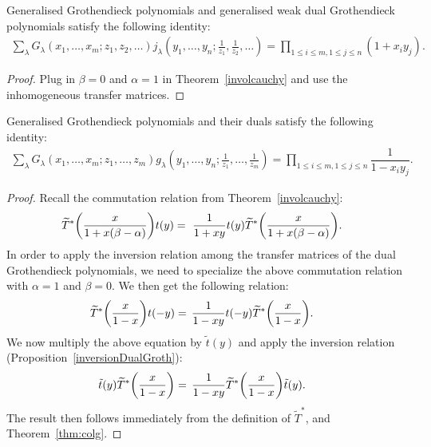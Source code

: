 \documentclass[ALCO, Unicode]{cedram}
\DeclarePairedDelimiter\autobracket{(}{)}
\newcommand{\br}[1]{\autobracket*{#1}}
\begin{document}
\begin{coro}
Generalised Grothendieck polynomials and generalised weak dual Grothendieck polynomials satisfy the following identity:
\begin{align}
\sum_{\lambda} G_{\lambda}(x_1,\dots,x_m;z_1,z_2,\dots) j_{\lambda} (y_1,\dots,y_n;\frac{1}{z_1},\frac{1}{z_2},\dots)= \prod_{1\le i\le m,1\le j\leq n} \left({1+x_iy_j} \right).
\end{align}
\end{coro}
\begin{proof}
Plug in $\beta=0$ and $\alpha=1$ in Theorem~\ref{involcauchy} and use the inhomogeneous transfer matrices.
\end{proof}

\begin{thm}
Generalised Grothendieck polynomials and their duals satisfy the following identity:
\begin{align}
\label{grothvsdual}
\sum_{\lambda} G_{\lambda}(x_1,\dots,x_m;z_1,\dots,z_m) g_{\lambda} (y_1,\dots,y_n;\frac{1}{z_1},\dots,\frac{1}{z_m})= \prod_{1\le i\le m,1\le j\leq n} \dfrac{1}{1-x_iy_j}.
\end{align}
\end{thm}
\begin{proof}
Recall the commutation relation from Theorem~\ref{involcauchy}:
\begin{align*}
\widetilde{T}^{*} \br{\dfrac{x}{1+x(\beta-\alpha)}}{t}(y)&=\text{ } \frac{1}{1+xy}  {t}(y)\widetilde{T}^{*} \br{\dfrac{x}{1+x(\beta-\alpha)}}.
\end{align*}
In order to apply the inversion relation among the transfer matrices of the dual Grothendieck polynomials, we need to specialize the above commutation relation with $\alpha=1$ and $\beta=0$. We then get the following relation:
\begin{align*}
\widetilde{T}^{*} \br{\dfrac{x}{1-x}}{t}\br{-y}&=\, \frac{1}{1-xy}  {t}\br{-y}\widetilde{T}^{*} \br{\dfrac{x}{1-x}}.
\end{align*}
 We now multiply the above equation by $\tilde{t}(y)$ and apply the inversion relation (Proposition~\ref{inversionDualGroth}):
 \begin{align*}
\tilde{t}(y)\widetilde{T}^{*} \br{\dfrac{x}{1-x}}&=\, \frac{1}{1-xy}  \widetilde{T}^{*} \br{\dfrac{x}{1-x}}\tilde{t}(y).
\end{align*}
The result then follows immediately from the definition of $\widetilde{T}^{*}$, and Theorem~\ref{thm:colg}.
\end{proof}
\end{document}
